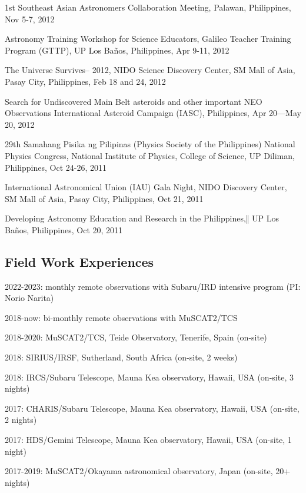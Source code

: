 \documentclass[12pt,letterpaper]{article}
\begin{document}
\begin{list}{}{\cvlist}
    \item 1st Southeast Asian Astronomers Collaboration Meeting, Palawan, Philippines, Nov 5-7, 2012
    \item Astronomy Training Workshop for Science Educators, Galileo Teacher Training Program (GTTP), UP Los Baños, Philippines, Apr 9-11, 2012
    \item The Universe Survives– 2012, NIDO Science Discovery Center, SM Mall of Asia, Pasay City, Philippines, Feb 18 and 24, 2012
    \item Search for Undiscovered Main Belt asteroids and other important NEO Observations International Asteroid Campaign (IASC), Philippines, Apr 20—May 20, 2012
    \item 29th Samahang Pisika ng Pilipinas (Physics Society of the Philippines) National Physics Congress, National Institute of Physics, College of Science, UP Diliman, Philippines, Oct 24-26, 2011
    \item International Astronomical Union (IAU) Gala Night, NIDO Discovery Center, SM Mall of Asia, Pasay City, Philippines, Oct 21, 2011
    \item Developing Astronomy Education and Research in the Philippines,‖ UP Los Baños, Philippines, Oct 20, 2011
\end{list}

\subsection{Field Work Experiences}
\begin{list}{}{\cvlist}
    \item 2022-2023: monthly remote observations with Subaru/IRD intensive program (PI: Norio Narita)
    \item 2018-now: bi-monthly remote observations with MuSCAT2/TCS
    \item 2018-2020: MuSCAT2/TCS, Teide Observatory, Tenerife, Spain (on-site) 
    \item 2018: SIRIUS/IRSF, Sutherland, South Africa (on-site, 2 weeks)
    \item 2018: IRCS/Subaru Telescope, Mauna Kea observatory, Hawaii, USA (on-site, 3 nights)
    \item 2017: CHARIS/Subaru Telescope, Mauna Kea observatory, Hawaii, USA (on-site, 2 nights)
    \item 2017: HDS/Gemini Telescope, Mauna Kea observatory, Hawaii, USA (on-site, 1 night)
    \item 2017-2019: MuSCAT2/Okayama astronomical observatory, Japan (on-site, 20+ nights)
\end{list}
\end{document}

